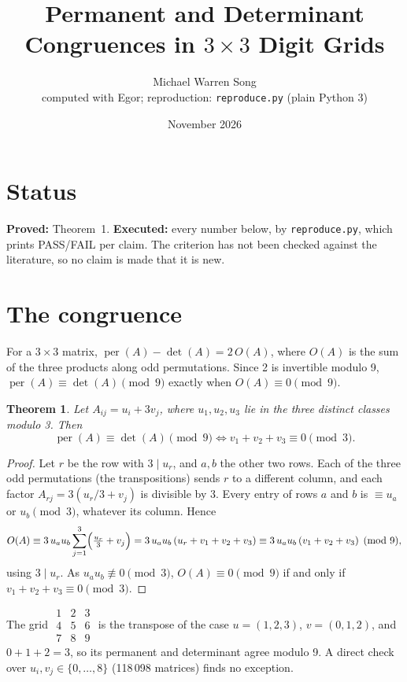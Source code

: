 \documentclass[11pt]{article}
\title{Permanent and Determinant Congruences in $3\times3$ Digit Grids}
\author{Michael Warren Song\\ \small computed with Egor; reproduction: \texttt{reproduce.py} (plain Python 3)}
\date{November 2026}
\newtheorem{theorem}{Theorem}
\begin{document}
\maketitle

\section*{Status}
\textbf{Proved:} Theorem~1. \textbf{Executed:} every number below, by \texttt{reproduce.py}, which prints PASS/FAIL per claim.
The criterion has not been checked against the literature, so no claim is made that it is new.

\section{The congruence}
For a $3\times3$ matrix, $\operatorname{per}(A)-\det(A)=2\,O(A)$, where $O(A)$ is the sum of the three products along odd
permutations. Since 2 is invertible modulo 9, $\operatorname{per}(A)\equiv\det(A)\pmod 9$ exactly when $O(A)\equiv0\pmod9$.

\begin{theorem}
Let $A_{ij}=u_i+3v_j$, where $u_1,u_2,u_3$ lie in the three distinct classes modulo 3. Then
\[\operatorname{per}(A)\equiv\det(A)\pmod 9\iff v_1+v_2+v_3\equiv0\pmod3.\]
\end{theorem}
\begin{proof}
Let $r$ be the row with $3\mid u_r$, and $a,b$ the other two rows. Each of the three odd permutations (the transpositions)
sends $r$ to a different column, and each factor $A_{rj}=3(u_r/3+v_j)$ is divisible by 3. Every entry of rows $a$ and $b$ is
$\equiv u_a$ or $u_b\pmod 3$, whatever its column. Hence
\[O(A)\equiv 3\,u_au_b\sum_{j=1}^{3}\Bigl(\tfrac{u_r}{3}+v_j\Bigr)=3\,u_au_b\,(u_r+v_1+v_2+v_3)\equiv 3\,u_au_b\,(v_1+v_2+v_3)\pmod 9,\]
using $3\mid u_r$. As $u_au_b\not\equiv0\pmod3$, $O(A)\equiv0\pmod9$ if and only if $v_1+v_2+v_3\equiv0\pmod3$.
\end{proof}
The grid $\begin{smallmatrix}1&2&3\\4&5&6\\7&8&9\end{smallmatrix}$ is the transpose of the case $u=(1,2,3)$, $v=(0,1,2)$, and
$0+1+2=3$, so its permanent and determinant agree modulo 9. A direct check over $u_i,v_j\in\{0,\dots,8\}$ (118\,098 matrices)
finds no exception.
\end{document}
